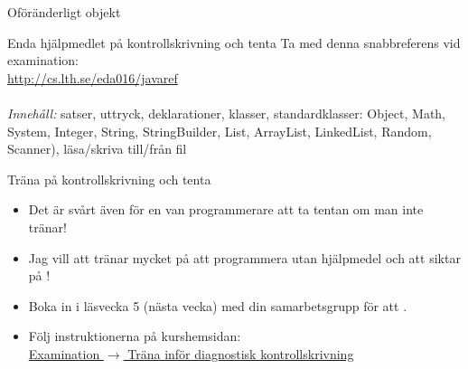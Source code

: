 \documentclass{lecturenotes}
\begin{document}
\begin{Slide}{Oföränderligt objekt}

\end{Slide}

\begin{Slide}{Enda hjälpmedlet på kontrollskrivning och tenta}
Ta med denna snabbreferens  vid examination: \\ 
\url{http://cs.lth.se/eda016/javaref} \\ \vspace{1em}
 \\ \vspace{1em}
\textit{Innehåll:} satser, uttryck, deklarationer, klasser, standardklasser: Object, Math, System, Integer, String, StringBuilder, List, ArrayList, LinkedList, Random, Scanner), läsa/skriva till/från fil  
\end{Slide}

\begin{Slide}{Träna på kontrollskrivning och tenta}
\begin{itemize}
\item Det är svårt även för en van programmerare att ta tentan om man inte tränar!
\item Jag vill att  tränar mycket på att programmera utan hjälpmedel och att  siktar på !
\item Boka in  i läsvecka 5 (nästa vecka) med din samarbetsgrupp för att .
\item Följ instruktionerna på kurshemsidan: \\ \href{http://cs.lth.se/eda016/examination/}{Examination $\rightarrow$ Träna inför diagnostisk kontrollskrivning}
\end{itemize}
\end{Slide}
\end{document}
